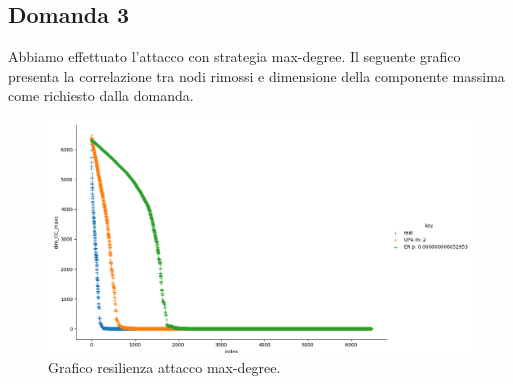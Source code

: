 \documentclass{article}
\begin{document}
\newpage
\begin{landscape}
    \section*{Domanda 3}
Abbiamo effettuato l'attacco con strategia max-degree. Il seguente grafico presenta la correlazione tra nodi rimossi e dimensione della componente massima come richiesto dalla domanda.
	\begin{figure}[h]
		\centering
		\includegraphics[width=1.25\textwidth]{../grafici/Figure_3}
		\caption{Grafico resilienza attacco max-degree.}
	\end{figure}
\end{landscape}
\end{document}
